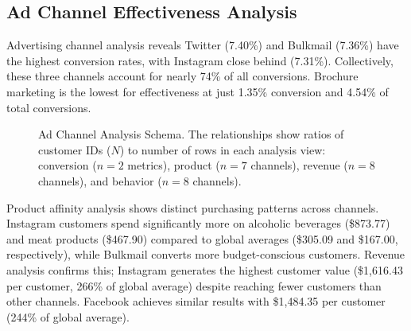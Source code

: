 \documentclass[12pt,a4paper]{article}
\begin{document}
\subsection{Ad Channel Effectiveness Analysis}
Advertising channel analysis reveals Twitter (7.40\%) and Bulkmail (7.36\%) have the highest conversion rates, with Instagram close behind (7.31\%). Collectively, these three channels account for nearly 74\% of all conversions. Brochure marketing is the lowest for effectiveness at just 1.35\% conversion and 4.54\% of total conversions.\\
\begin{figure}[h!]
\centering
{}
\vspace{5pt}
\caption{Ad Channel Analysis Schema. The relationships show ratios of customer IDs ($N$) to number of rows in each analysis view: conversion ($n=2$ metrics), product ($n=7$ channels), revenue ($n=8$ channels), and behavior ($n=8$ channels).}
\label{fig:ad-channel-schema}
\end{figure}
\FloatBarrier
\vspace{5pt}
\noindent Product affinity analysis shows distinct purchasing patterns across channels. Instagram customers spend significantly more on alcoholic beverages (\$873.77) and meat products (\$467.90) compared to global averages (\$305.09 and \$167.00, respectively), while Bulkmail converts more budget-conscious customers. Revenue analysis confirms this; Instagram generates the highest customer value (\$1,616.43 per customer, 266\% of global average) despite reaching fewer customers than other channels. Facebook achieves similar results with \$1,484.35 per customer (244\% of global average).\\
\end{document}
